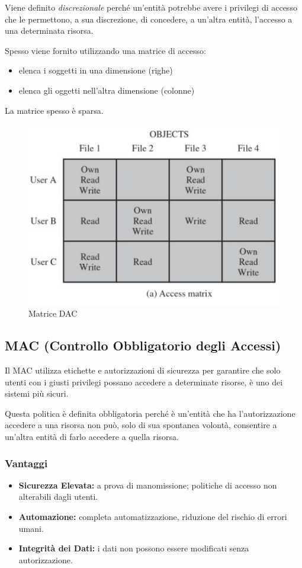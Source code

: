 Viene definito \textit{discrezionale} perché un’entità potrebbe avere i
privilegi di accesso che le permettono, a sua
discrezione, di concedere, a un’altra entità,
l’accesso a una determinata risorsa.

Spesso viene fornito utilizzando una matrice di accesso:
\begin{itemize}
    \item elenca i soggetti in una dimensione (righe)
    \item elenca gli oggetti nell'altra dimensione (colonne)
\end{itemize}
La matrice spesso è sparsa.

\begin{figure}[ht]
    \centering
    \includegraphics[width=0.6\linewidth]{chapters/images2/dac.png}
    \caption{Matrice DAC}
\end{figure}


\subsection{MAC (Controllo Obbligatorio degli Accessi)}
Il MAC utilizza etichette e autorizzazioni di sicurezza per garantire che solo utenti con i giusti privilegi possano accedere a determinate risorse, è uno dei sistemi più sicuri.

Questa politica è definita obbligatoria perché è
un'entità che ha l'autorizzazione accedere a una
risorsa non può, solo di sua spontanea volontà,
consentire a un'altra entità di farlo accedere a
quella risorsa.

\subsubsection{Vantaggi}
\begin{itemize}
    \item \textbf{Sicurezza Elevata:} a prova di manomissione; politiche di accesso non alterabili dagli utenti.
    \item \textbf{Automazione:} completa automatizzazione, riduzione del rischio di errori umani.
    \item \textbf{Integrità dei Dati:} i dati non possono essere modificati senza autorizzazione.
\end{itemize}

